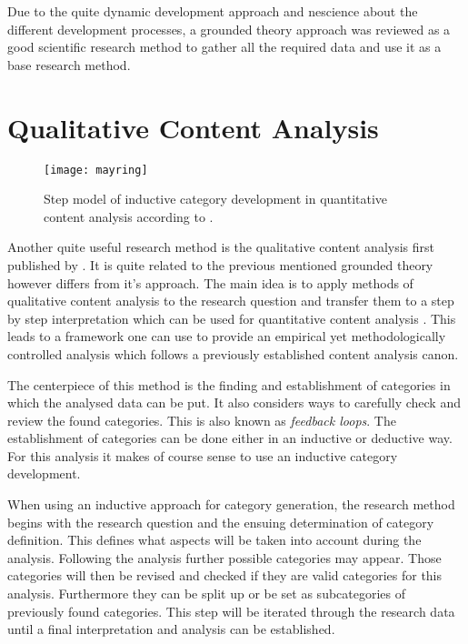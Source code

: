Due to the quite dynamic development approach and nescience about the different
development processes, a grounded theory approach was reviewed as a good
scientific research method to gather all the required data and use it as a base
research method.


\section{Qualitative Content Analysis} %

\begin{figure}[htbp]
  \centering
  \texttt{[image: mayring]}
  \caption{Step model of inductive category development in quantitative content
    analysis according to \citeauthor{Mayring2008} \cite{Mayring2000,Mayring2008}.}
\end{figure}

Another quite useful research method is the qualitative content analysis first
published by \textcite{Mayring2008}. It is quite related to the previous
mentioned grounded theory however differs from it's approach. The main idea is
to apply methods of qualitative content analysis to the research question and
transfer them to a step by step interpretation which can be used for
quantitative content analysis \cite{Mayring2000}. This leads to a framework one
can use to provide an empirical yet methodologically controlled analysis which
follows a previously established content analysis canon.

The centerpiece of this method is the finding and establishment of categories
in which the analysed data can be put. It also considers ways to carefully
check and review the found categories. This is also known as \emph{feedback
loops}. The establishment of categories can be done either in an inductive or
deductive way. For this analysis it makes of course sense to use an inductive
category development.

When using an inductive approach for category generation, the research method
begins with the research question and the ensuing determination of category
definition. This defines what aspects will be taken into account during the
analysis. Following the analysis further possible categories may appear. Those
categories will then be revised and checked if they are valid categories for
this analysis. Furthermore they can be split up or be set as subcategories of
previously found categories. This step will be iterated through the research
data until a final interpretation and analysis can be established.

